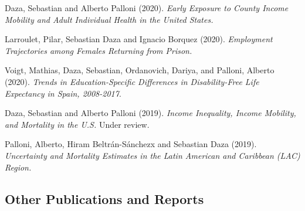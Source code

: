 \documentclass[10pt,letterpaper]{article}
\renewenvironment{itemize}{
  \begin{list}{}{
    \setlength{\leftmargin}{1.5em}
    \setlength{\itemsep}{0.25em}
    \setlength{\parskip}{0pt}
    \setlength{\parsep}{0.25em}
  }
}{
  \end{list}
}
\begin{document}
\begin{itemize}

\item Daza, Sebastian and Alberto Palloni (2020). {\textit{Early Exposure to County Income Mobility and Adult Individual Health in the United States.}}
\item Larroulet, Pilar, Sebastian Daza and Ignacio Borquez (2020). {\textit{Employment Trajectories among Females Returning from Prison.}}
\item Voigt, Mathias, Daza, Sebastian, Ordanovich, Dariya, and Palloni, Alberto (2020). {\textit{Trends in Education-Specific Differences in Disability-Free Life Expectancy in Spain, 2008-2017}}.
\item Daza, Sebastian and Alberto Palloni (2019). {\textit{Income Inequality, Income Mobility, and Mortality in the U.S.}} Under review.
\item Palloni, Alberto, Hiram Beltrán-Sánchezx and Sebastian Daza (2019). {\textit{Uncertainty and Mortality Estimates in the Latin American and Caribbean (LAC) Region.}}

\end{itemize}

\subsection*{Other Publications and Reports}
\end{document}
